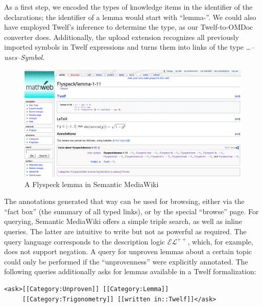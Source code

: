 As a first step, we encoded the types of knowledge items in the identifier of
the declarations; the identifier of a lemma would start with ``lemma-''.  We
could also have employed Twelf's inference to determine the
type, as our Twelf-to-OMDoc converter does.  Additionally, the upload
extension recognizes all previously imported symbols in Twelf expressions and
turns them into links of the type \textit{\ldots--uses--Symbol}.

\begin{figure}
  \centering
  \includegraphics[width=\textwidth]{images/smw-lemma}
  \caption[A Flyspeck lemma in Semantic MediaWiki]{A Flyspeck lemma in Semantic
    MediaWiki\protect\footnotemark}
  \label{fig:smw-lemma}
\end{figure}
\addtocounter{footnote}{-1}

The annotations generated that way can be used for browsing, either via the
``fact box'' (the summary of all typed links), or by the special ``browse''
page.  For querying, Semantic MediaWiki offers a simple triple search, as well
as inline queries.  The latter are intuitive to write but not as powerful as
required.  The query language corresponds to the description logic
$\mathcal{EL}^{++}$\cite{KrSchVr:semwiki-reasoning07}, which, for example, does
not support negation.  A query for unproven lemmas about a certain topic could
only be performed if the ``unprovenness'' were explicitly annotated.  The
following queries additionally asks for lemmas available in a Twelf formalization:

\begin{lstlisting}
<ask>[[Category:Unproven]] [[Category:Lemma]]
     [[Category:Trigonometry]] [[written in::Twelf]]</ask>
\end{lstlisting}

